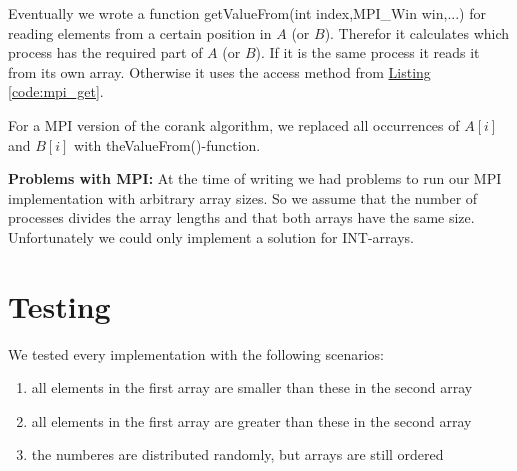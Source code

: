 Eventually we wrote a function getValueFrom(int index,MPI\_Win win,...) for reading elements from a certain position in $A$ (or $B$).
Therefor it calculates which process has the required part of $A$ (or $B$).
If it is the same process it reads it from its own array.
Otherwise it uses the access method from \hyperref[code:mpi_get]{Listing \ref*{code:mpi_get}}.

For a MPI version of the corank algorithm, we replaced all occurrences of $A[i]$ and $B[i]$ with theValueFrom()-function.


\textbf{Problems with MPI:}
At the time of writing we had problems to run our MPI implementation with arbitrary array sizes.
So we assume that the number of processes divides the array lengths and that both arrays have the same size.
Unfortunately we could only implement a solution for INT-arrays.

\section{Testing}
We tested every implementation with the following scenarios:
\begin{enumerate}
  \item all elements in the first array are smaller than these in the second array
  \item all elements in the first array are greater than these in the second array
  \item the numberes are distributed randomly, but arrays are still ordered
\end{enumerate}



